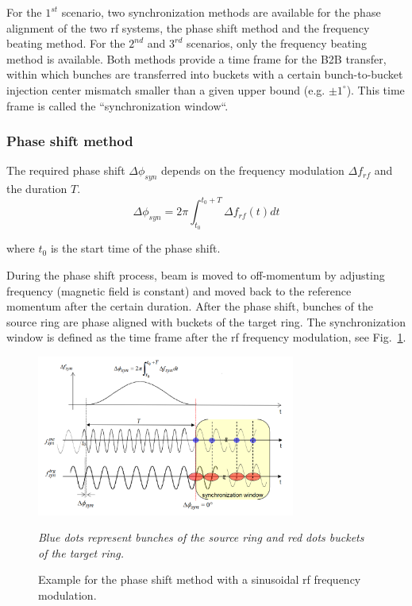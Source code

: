 For the $1^{st}$ scenario, two synchronization methods are available for the phase alignment of the two rf systems, the phase shift method and the frequency beating method. For the $2^{nd}$ and $3^{rd}$ scenarios, only the frequency beating method is available. Both methods provide a time frame for the B2B transfer, within which bunches are transferred into buckets with a certain bunch-to-bucket injection center mismatch smaller than a given upper bound (e.g. $\pm1^\circ$). This time frame is called the “synchronization window“. 

\subsubsection{Phase shift method}
The required phase shift $\Delta \phi_\mathit{syn}$ depends on the frequency modulation $\Delta f_\mathit{rf}$ and the duration $T$. 
\begin{equation}
\Delta \phi_\mathit{syn}= 2\pi \int_{t_0}^{t_0+T} \Delta f_\mathit{rf}(t)dt \label{phase1}
\end{equation}

where $t_0$ is the start time of the phase shift.

During the phase shift process, beam is moved to off-momentum by adjusting frequency (magnetic field is constant) and moved back to the reference momentum after the certain duration. After the phase shift, bunches of the source ring are phase aligned with buckets of the target ring. The synchronization window is defined as the time frame after the rf frequency modulation, see Fig.~\ref{phase_shift}.
\begin{figure}[!htb]
   \centering   
   \includegraphics*[width=85mm]{phase_shift.png}
   \caption{Example for the phase shift method with a sinusoidal rf frequency modulation.}{\textsl{\small{Blue dots represent bunches of the source ring and red dots buckets of the target ring.}}}
   \label{phase_shift}
\end{figure} 


